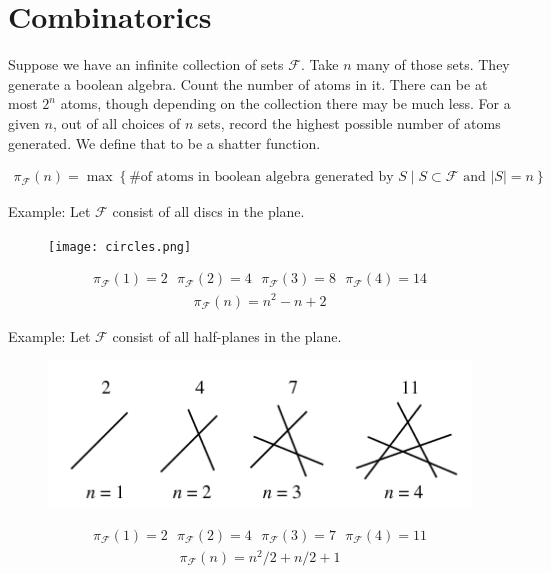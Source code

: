 \documentclass{amsart}
\newcommand{\F}{\mathcal F}
\newcommand{\curly}[1]{\left\{ #1 \right\}}
\begin{document}
\section{Combinatorics}

Suppose we have an infinite collection of sets $\F$.
Take $n$ many of those sets.
They generate a boolean algebra.
Count the number of atoms in it.
There can be at most $2^n$ atoms, though depending on the collection there may be much less.
For a given $n$, out of all choices of $n$ sets, record the highest possible number of atoms generated.
We define that to be a shatter function.

\begin{Definition}
	\begin{align*}
		\pi_\F(n) = \max \curly{ \text {\# of atoms in boolean algebra generated by $S$} \mid S \subset \F \text{ and } |S| = n}
	\end{align*}
\end{Definition}

Example: Let $\F$ consist of all discs in the plane.
\begin{figure}[p]
	\centering
	\texttt{[image: circles.png]}
\end{figure}
\begin{align*}
	\pi_\F(1) = 2 \ \ \  \pi_\F(2) = 4 \ \ \  \pi_\F(3) = 8  \ \ \ \pi_\F(4) = 14
\end{align*}
\begin{align*}
	\pi_\F(n) = n^2 - n + 2
\end{align*}

Example: Let $\F$ consist of all half-planes in the plane.
\begin{figure}[p]
	\centering
	\includegraphics[scale=0.75]{lines.png}
\end{figure}
\begin{align*}
	\pi_\F(1) = 2 \ \ \  \pi_\F(2) = 4 \ \ \  \pi_\F(3) = 7  \ \ \ \pi_\F(4) = 11
\end{align*}
\begin{align*}
	\pi_\F(n) = n^2/2 + n/2 + 1
\end{align*}
\end{document}
